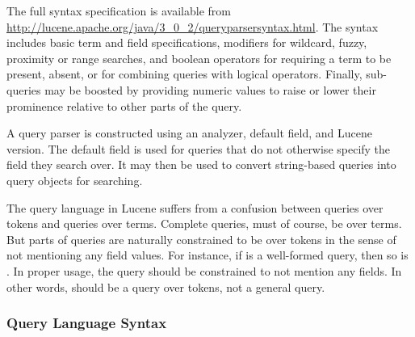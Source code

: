 The full syntax specification is available from
\url{http://lucene.apache.org/java/3_0_2/queryparsersyntax.html}.  The
syntax includes basic term and field specifications, modifiers for
wildcard, fuzzy, proximity or range searches, and boolean operators
for requiring a term to be present, absent, or for combining queries
with logical operators.  Finally, sub-queries may be boosted by providing
numeric values to raise or lower their prominence relative to other
parts of the query.

A query parser is constructed using an analyzer, default field, and
Lucene version.  The default field is used for queries that do not
otherwise specify the field they search over.  It may then be used to
convert string-based queries into query objects for searching.

The query language in Lucene suffers from a confusion between queries
over tokens and queries over terms.  Complete queries, must of course,
be over terms.  But parts of queries are naturally constrained to be
over tokens in the sense of not mentioning any field values.  For
instance, if  is a well-formed query, then so is
.  In proper usage, the query  should
be constrained to not mention any fields.  In other words, 
should be a query over tokens, not a general query.

\subsubsection{Query Language Syntax}


